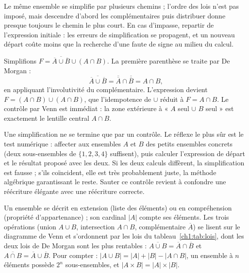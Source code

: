 Le même ensemble se simplifie par plusieurs chemins ; l'ordre des lois n'est pas imposé, mais descendre d'abord les complémentaires puis distribuer donne presque toujours le chemin le plus court. En cas d'impasse, repartir de l'expression initiale : les erreurs de simplification se propagent, et un nouveau départ coûte moins que la recherche d'une faute de signe au milieu du calcul.

\begin{exemple}
Simplifions $F = \overline{\overline{A} \cup \overline{B}} \cup (A \cap B)$. La première parenthèse se traite par De Morgan :
\[
\overline{\overline{A} \cup \overline{B}} = \overline{\overline{A}} \cap \overline{\overline{B}} = A \cap B,
\]
en appliquant l'involutivité du complémentaire. L'expression devient $F = (A \cap B) \cup (A \cap B)$, que l'idempotence de $\cup$ réduit à $F = A \cap B$. Le contrôle par Venn est immédiat : la zone extérieure à « $A$ seul $\cup$ $B$ seul » est exactement le lentille central $A \cap B$.
\end{exemple}

\begin{attention}
Une simplification ne se termine que par un contrôle. Le réflexe le plus sûr est le test numérique : affecter aux ensembles $A$ et $B$ des petits ensembles concrets (deux sous-ensembles de $\{1, 2, 3, 4\}$ suffisent), puis calculer l'expression de départ et le résultat proposé avec les deux. Si les deux calculs diffèrent, la simplification est fausse ; s'ils coïncident, elle est très probablement juste, la méthode algébrique garantissant le reste. Sauter ce contrôle revient à confondre une réécriture élégante avec une réécriture correcte.
\end{attention}

\begin{aretirer}
Un ensemble se décrit en extension (liste des éléments) ou en compréhension (propriété d'appartenance) ; son cardinal $|A|$ compte ses éléments. Les trois opérations (union $A \cup B$, intersection $A \cap B$, complémentaire $\overline{A}$) se lisent sur le diagramme de Venn et s'ordonnent par les lois du tableau~\ref{ch1:tab:lois}, dont les deux lois de De Morgan sont les plus rentables : $\overline{A \cup B} = \overline{A} \cap \overline{B}$ et $\overline{A \cap B} = \overline{A} \cup \overline{B}$. Pour compter : $|A \cup B| = |A| + |B| - |A \cap B|$, un ensemble à $n$ éléments possède $2^{n}$ sous-ensembles, et $|A \times B| = |A| \times |B|$.
\end{aretirer}
